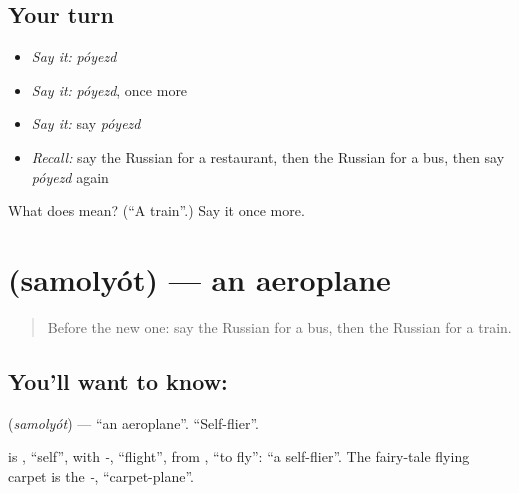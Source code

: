 \subsection*{Your turn}
\begin{itemize}
\raggedright
  \item \emph{Say it:} \emph{póyezd}
  \item \emph{Say it:} \emph{póyezd}, once more
  \item \emph{Say it:} say \emph{póyezd}
  \item \emph{Recall:} say the Russian for a restaurant, then the Russian for a bus, then say \emph{póyezd} again
\end{itemize}

\begin{tcolorbox}[breakable,colback=teal!4,colframe=teal!35!black,title={Before you move on}]
What does  mean? (\textquotedblleft{}A train\textquotedblright{}.) Say it once more.
\end{tcolorbox}
\section[\texorpdfstring{\ru{самолёт} (samolyót)}{самолёт (samolyót)}]{ (samolyót) — an aeroplane}

\label{lesson:RU-C79-plane}



\begin{quote}
Before the new one: say the Russian for a bus, then the Russian for a train.
\end{quote}

\subsection*{You'll want to know: }
\textbf{} (\emph{samolyót}) — \textquotedblleft{}an aeroplane\textquotedblright{}. \textquotedblleft{}Self-flier\textquotedblright{}.

\begin{cousinweb}
\textbf{} is \emph{}, \textquotedblleft{}self\textquotedblright{}, with \emph{-}, \textquotedblleft{}flight\textquotedblright{}, from \emph{}, \textquotedblleft{}to fly\textquotedblright{}: \textquotedblleft{}a self-flier\textquotedblright{}. The fairy-tale flying carpet is the \emph{-}, \textquotedblleft{}carpet-plane\textquotedblright{}.
\end{cousinweb}

